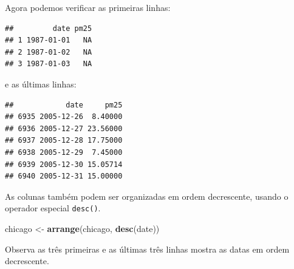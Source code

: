 \documentclass[a4paper]{book}
\newenvironment{Shaded}{\begin{snugshade}}{\end{snugshade}}
\newcommand{\DecValTok}[1]{\textcolor[rgb]{0.00,0.00,0.81}{#1}}
\newcommand{\KeywordTok}[1]{\textcolor[rgb]{0.13,0.29,0.53}{\textbf{#1}}}
\newcommand{\NormalTok}[1]{#1}
\newcommand{\OperatorTok}[1]{\textcolor[rgb]{0.81,0.36,0.00}{\textbf{#1}}}
\newcommand{\StringTok}[1]{\textcolor[rgb]{0.31,0.60,0.02}{#1}}
\begin{document}
Agora podemos verificar as primeiras linhas:

\begin{Shaded}
\end{Shaded}

\begin{verbatim}
##         date pm25
## 1 1987-01-01   NA
## 2 1987-01-02   NA
## 3 1987-01-03   NA
\end{verbatim}

e as últimas linhas:

\begin{Shaded}
\end{Shaded}

\begin{verbatim}
##            date     pm25
## 6935 2005-12-26  8.40000
## 6936 2005-12-27 23.56000
## 6937 2005-12-28 17.75000
## 6938 2005-12-29  7.45000
## 6939 2005-12-30 15.05714
## 6940 2005-12-31 15.00000
\end{verbatim}

As colunas também podem ser organizadas em ordem decrescente, usando o operador especial \texttt{desc()}.

\begin{Shaded}
\begin{Highlighting}[]
\NormalTok{chicago <-}\StringTok{ }\KeywordTok{arrange}\NormalTok{(chicago, }\KeywordTok{desc}\NormalTok{(date))}
\end{Highlighting}
\end{Shaded}

Observa as três primeiras e as últimas três linhas mostra as datas em ordem decrescente.

\begin{Shaded}
\end{Shaded}
\end{document}
